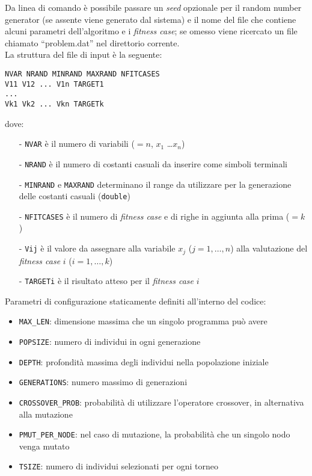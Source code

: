 \documentclass{../llncs}
\begin{document}
Da linea di comando è possibile passare un \emph{seed} opzionale per il random number generator (se assente viene generato dal sistema) e il nome del file che contiene alcuni parametri dell'algoritmo e i \emph{fitness case}; se omesso viene ricercato un file chiamato ``problem.dat'' nel direttorio corrente.\\

\noindent La struttura del file di input è la seguente:
\begin{lstlisting}[caption={Struttura del file di input}]
NVAR NRAND MINRAND MAXRAND NFITCASES
V11 V12 ... V1n TARGET1
...
Vk1 Vk2 ... Vkn TARGETk
\end{lstlisting}
dove:
\begin{itemize}
\setlength\itemsep{0.1em}
\item[-] \texttt{NVAR} è il numero di variabili ($=n$, $x_1$ \ldots $x_n$)
\item[-] \texttt{NRAND} è il numero di costanti casuali da inserire come simboli terminali
\item[-] \texttt{MINRAND} e \texttt{MAXRAND} determinano il range da utilizzare per la generazione delle costanti casuali (\texttt{double})
\item[-] \texttt{NFITCASES} è il numero di \emph{fitness case} e di righe in aggiunta alla prima ($=k$)
\item[-] \texttt{Vij} è il valore da assegnare alla variabile $x_j$ ($j = 1, \ldots, n$) alla valutazione del \emph{fitness case} $i$ ($i = 1, \ldots, k$)
\item[-] \texttt{TARGETi} è il risultato atteso per il \emph{fitness case} $i$
\end{itemize}

\noindent Parametri di configurazione staticamente definiti all'interno del codice:
\begin{itemize}
\setlength\itemsep{0.1em}
\item \texttt{MAX{\_}LEN}: dimensione massima che un singolo programma può avere
\item \texttt{POPSIZE}: numero di individui in ogni generazione
\item \texttt{DEPTH}: profondità massima degli individui nella popolazione iniziale
\item \texttt{GENERATIONS}: numero massimo di generazioni
\item \texttt{CROSSOVER{\_}PROB}: probabilità di utilizzare l'operatore crossover, in alternativa alla mutazione
\item \texttt{PMUT{\_}PER{\_}NODE}: nel caso di mutazione, la probabilità che un singolo nodo venga mutato
\item \texttt{TSIZE}: numero di individui selezionati per ogni torneo
\end{itemize}
\end{document}
